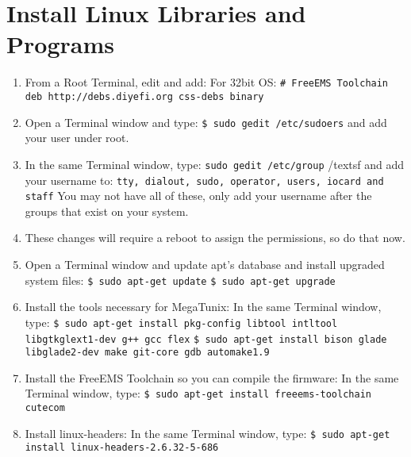 \documentclass[12pt,notitlepage,onecolumn,oneside,openany]{memoir}
\begin{document}
\chapter{\textsf{Install Linux Libraries and Programs}}

\begin{enumerate}
\item \textsf{From a Root Terminal, edit  and add:} \newline
	\textsf{For 32bit OS:} \newline
\texttt{\# FreeEMS Toolchain} \newline
\texttt{deb http://debs.diyefi.org css-debs binary}

\item \textsf{Open a Terminal window and type:} \newline
      \texttt{\$ sudo gedit /etc/sudoers} \newline
      \textsf{and add your user under root.}

\item \textsf{In the same Terminal window, type:} \newline
      \texttt{sudo gedit /etc/group} /textsf{ and add your username to:} \newline
      \texttt{tty, dialout, sudo, operator, users, iocard and staff} \newline
      \textsf{You may not have all of these, only add your username after the groups that exist on your system.}

\item \textsf{These changes will require a reboot to assign the permissions, so do that now.}

\item \textsf{Open a Terminal window and update apt's database and install upgraded system files:} \newline
      \texttt{\$ sudo apt-get update} \newline
      \texttt{\$ sudo apt-get upgrade}

\item \textsf{Install the tools necessary for MegaTunix:} \newline
      \textsf{In the same Terminal window, type:} \newline
      \texttt{\$ sudo apt-get install pkg-config libtool intltool libgtkglext1-dev g++ gcc flex} \newline
      \texttt{\$ sudo apt-get install bison glade libglade2-dev make git-core gdb automake1.9}

\item \textsf{Install the FreeEMS Toolchain so you can compile the firmware:} \newline
      \textsf{In the same Terminal window, type:} \newline
      \texttt{\$ sudo apt-get install freeems-toolchain cutecom}

\item \textsf{Install linux-headers:} \newline
      \textsf{In the same Terminal window, type:} \newline
      \texttt{\$ sudo apt-get install linux-headers-2.6.32-5-686}
\end{enumerate}
\end{document}
